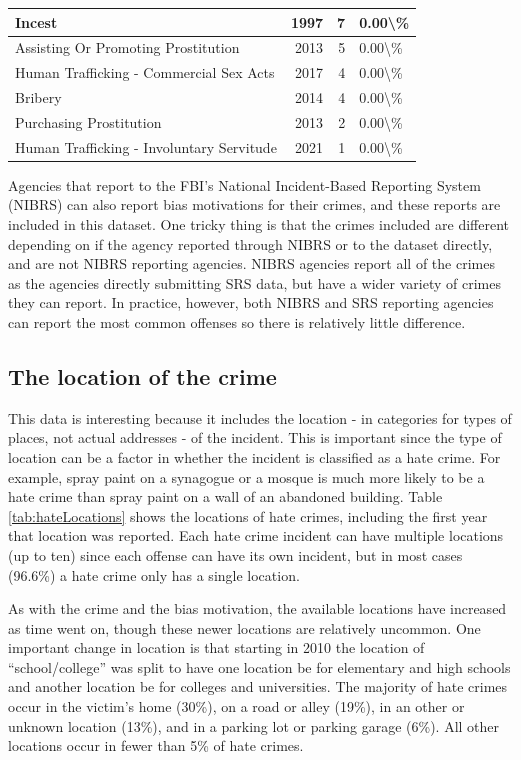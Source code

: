 \documentclass[
]{krantz}
\begin{document}
\begin{longtable}[t]{l|r|r|l}
\hline
Incest & 1997 & 7 & 0.00\textbackslash{}\%\\
\hline
Assisting Or Promoting Prostitution & 2013 & 5 & 0.00\textbackslash{}\%\\
\hline
Human Trafficking - Commercial Sex Acts & 2017 & 4 & 0.00\textbackslash{}\%\\
\hline
Bribery & 2014 & 4 & 0.00\textbackslash{}\%\\
\hline
Purchasing Prostitution & 2013 & 2 & 0.00\textbackslash{}\%\\
\hline
Human Trafficking - Involuntary Servitude & 2021 & 1 & 0.00\textbackslash{}\%\\
\hline
\end{longtable}

Agencies that report to the FBI's National Incident-Based
Reporting System (NIBRS) can also report bias motivations
for their crimes, and these reports are included in this
dataset. One tricky thing is that the crimes included are
different depending on if the agency reported through NIBRS
or to the dataset directly, and are not NIBRS reporting
agencies. NIBRS agencies report all of the crimes as the
agencies directly submitting SRS data, but have a wider
variety of crimes they can report. In practice, however,
both NIBRS and SRS reporting agencies can report the most
common offenses so there is relatively little difference.

\subsection{The location of the
crime}\label{the-location-of-the-crime}

This data is interesting because it includes the location -
in categories for types of places, not actual addresses - of
the incident. This is important since the type of location
can be a factor in whether the incident is classified as a
hate crime. For example, spray paint on a synagogue or a
mosque is much more likely to be a hate crime than spray
paint on a wall of an abandoned building. Table
\ref{tab:hateLocations} shows the locations of hate crimes,
including the first year that location was reported. Each
hate crime incident can have multiple locations (up to ten)
since each offense can have its own incident, but in most
cases (96.6\%) a hate crime only has a single location.

As with the crime and the bias motivation, the available
locations have increased as time went on, though these newer
locations are relatively uncommon. One important change in
location is that starting in 2010 the location of
``school/college'' was split to have one location be for
elementary and high schools and another location be for
colleges and universities. The majority of hate crimes occur
in the victim's home (30\%), on a road or alley (19\%), in
an other or unknown location (13\%), and in a parking lot or
parking garage (6\%). All other locations occur in fewer
than 5\% of hate crimes.
\end{document}
